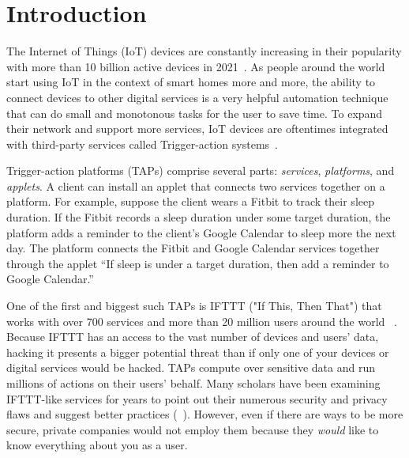 \section{Introduction}
\label{sec:intro}

The Internet of Things (IoT) devices are constantly increasing in their popularity with more than 10 billion
active devices in 2021~\cite{DBLP:webpage/Bojan/IoTstats}. As people around the world start using IoT
in the context of smart homes more and more, the ability to connect devices to other digital services is a
very helpful automation technique that can do small and monotonous tasks for the user to save time. To 
expand their network and support more services, IoT devices are oftentimes integrated with third-party
services called Trigger-action systems~\cite{DBLP:journals/access/XuZZCDG19, DBLP:conf/chi/UrHBLMPSL16}.

Trigger-action platforms (TAPs) comprise several parts: \emph{services}, \emph{platforms}, and
\emph{applets}. A client can install an applet that connects two services together on a platform. For
example, suppose the client wears a Fitbit to track their sleep duration. If the Fitbit records a sleep
duration under some target duration, the platform adds a reminder to the client's Google Calendar to 
sleep more the next day. The platform connects the Fitbit and Google Calendar services together 
through the applet ``If sleep is under a target duration, then add a reminder to
Google Calendar.''

One of the first and biggest such TAPs is IFTTT ("If This, Then That") that works with
over 700 services and more than 20 million users around the world ~\cite{ifttt-website, DBLP:conf/sp/ChenCWSCF21}. 
Because IFTTT has an access to the vast number of devices and users' data, hacking it presents a
bigger potential threat than if only one of your devices or digital services would be hacked. TAPs
compute over sensitive data and run millions of actions on their users' behalf. Many scholars have been
examining IFTTT-like services for years to point out their numerous security
and privacy flaws and suggest better practices (~\cite{DBLP:conf/sp/ChenCWSCF21, DBLP:journals/corr/abs-2009-12447, DBLP:conf/imc/MiQZW17, DBLP:journals/corr/FernandesRJP17, DBLP:conf/www/SurbatovichABDJ17, DBLP:journals/access/XuZZCDG19}). 
However, even if there are ways to be more secure, private companies would not employ them because 
they \emph{would} like to know everything about you as a user.


